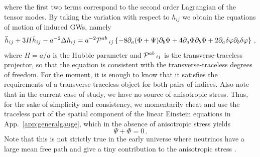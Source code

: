 \documentclass[a4paper,11pt]{article}
\numberwithin{equation}{section}
\begin{document}
where the first two terms correspond to the second order Lagrangian of the tensor modes.
By taking the variation with respect to $h_{ij}$ we obtain the equations of motion of induced GWs, namely
\begin{equation}\label{eq:eominducedGW}
\ddot h_{ij}+3H\dot h_{ij}-a^{-2}\Delta h_{ij}=a^{-2}{\cal P}^{ab}\,_{ij}\left\{-8\partial_a(\Phi+\Psi)\partial_b\Phi+4\partial_a \Phi \partial_b \Phi+2\partial_a \delta\varphi \partial_b \delta\varphi\right\}\,,
\end{equation}
where $H=\dot a/a$ is the Hubble parameter and ${\cal P}^{ab}\,_{ij}$ is the transverse-traceless projector, so that the equation is consistent with the transverse-traceless degrees of freedom. For the moment, it is enough to know that it satisfies the requirements of a transverse-traceless object for both pairs of indices. Also note that in the current case of study, we have no source of anisotropic stress. Thus, for the sake of simplicity and consistency, we momentarily cheat and use the traceless part of the spatial component of the linear Einstein equations in App.~\ref{app:generalgauge}, which in the absence of anisotropic stress yields
\begin{equation}
\Psi+\Phi=0\,.
\end{equation}
Note that this is not strictly true in the early universe where neutrinos have a large mean free path and give a tiny contribution to the anisotropic stress \cite{Baumann:2007zm,Mangilli:2008bw}.
\end{document}
